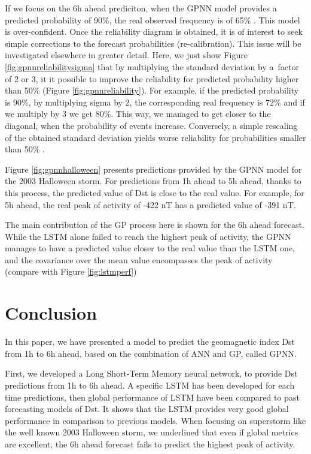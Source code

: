 If we focus on the 6h ahead prediciton, when the GPNN model provides a predicted probability of 90$\%$, the 
real observed frequency is of 65$\%$ . This model is over-confident. Once the reliability diagram is obtained, 
it is of interest to seek simple corrections to the forecast probabilities (re-calibration). This issue will be 
investigated elsewhere in greater detail. Here, we just show Figure \ref{fig:gpnnreliabilitysigma} that by multiplying 
the standard deviation by a\ factor of 2 or 3, it it possible to improve the reliability for predicted probability 
higher than 50$\%$ (Figure \ref{fig:gpnnreliability}). For example, if the predicted probability is 90$\%$, 
by multiplying sigma by 2, the corresponding real frequency is 72$\%$ and if we multiply by 3 we get 80$\%$. 
This way, we managed to get closer to the diagonal, when the probability of events increase. Conversely, 
a simple rescaling of the obtained standard deviation yields worse reliability for probabilities smaller than 50$\%$ .  


Figure \ref{fig:gpnnhalloween} presents predictions provided by the GPNN model for the 2003 Halloween storm. 
For predictions from 1h ahead to 5h ahead, thanks to this process, the predicted value of Dst is close to the 
real value. For example, for 5h ahead, the real peak of activity of -422 nT has a predicted value of -391 nT. 

The main contribution of the GP process here is shown for the 6h ahead forecast. While the LSTM alone failed to 
reach the highest peak of activity, the GPNN manages to have a predicted value closer to the real value than 
the LSTM one, and the covariance over the mean value encompasses the peak of activity 
(compare with Figure \ref{fig:lstmperf})



\section{Conclusion}


In this paper, we have presented a model to predict the geomagnetic index Dst from 1h to 6h ahead, 
based on the combination of ANN and GP, called GPNN. 

First, we developed a Long Short-Term Memory neural network, to provide Dst predictions from 1h to 6h ahead. 
A specific LSTM has been developed for each time predictions, then global performance of LSTM have been compared 
to past forecasting models of Dst. It shows that the LSTM provides very good global performance in comparison 
to previous models. When focusing on superstorm like the well known 2003 Halloween storm, we underlined that 
even if global metrics are excellent, the 6h ahead forecast fails to predict the highest peak of activity. 


